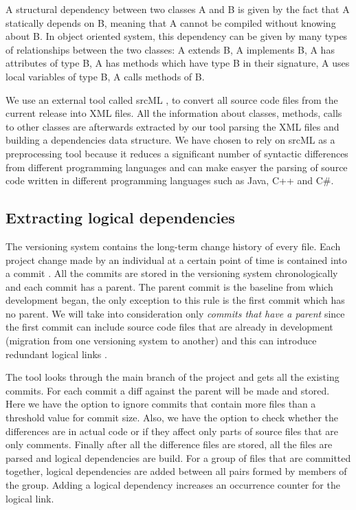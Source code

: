 \documentclass[conference]{IEEEtran}
\begin{document}
A structural dependency between two classes A and B is given by the fact that A statically depends on B, meaning that A cannot be compiled without knowing about B. In object oriented system, this dependency can be given by many types of relationships between the two classes: A extends B, A implements B, A has attributes of type B, A has methods which have type B in their signature, A uses local variables of type B, A calls methods of B.


 We use an external tool called srcML \cite{2003:XLC:851042.857028},
\cite{Collard:2011:LTF:2067850.2068011} to convert all source code files from the current release into XML files. All the information about classes, methods, calls to other classes are afterwards extracted by our tool parsing the XML files and building a dependencies data structure. We have chosen to rely on srcML as a preprocessing tool because it reduces a significant number of syntactic differences from different programming languages and can make easyer the parsing of source code written in different programming languages such as Java, C++ and C\#.    

\subsection{Extracting logical dependencies}

The versioning system contains the long-term change history of every file. Each project change made by an individual at a certain point of time is contained into a commit \cite{svn}. All the commits are stored in the versioning system chronologically and each commit has a parent. The parent commit is the baseline from which development began, the only exception to this rule is the first commit which has no parent. We will take into consideration only \textit{commits that have a parent} since the first commit can include source code files that are already in development (migration from one versioning system to another) and this can introduce redundant logical links \cite{DBLP:journals/jss/AjienkaC17}. 

The tool looks through the main branch of the project and gets all the existing commits. For each commit a diff against the parent will be made and stored. Here we have the option to ignore commits that contain more files than a threshold value for commit size. Also, we have the option to check whether the differences are in actual code or if they affect only parts of source files that are only comments.  Finally after all the difference files are stored, all the files are parsed and logical dependencies are build. For a group of files that are committed together, logical dependencies are added between all pairs formed by members of the group. Adding a logical dependency increases an occurrence counter for the logical link. 
\end{document}
